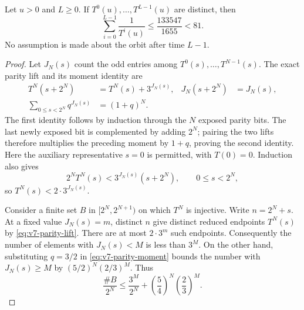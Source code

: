 \begin{theorem}\label{thm:v7-reciprocal}
Let $u>0$ and $L\ge0$. If $T^0(u),\ldots,T^{L-1}(u)$ are distinct, then
\begin{equation}\label{eq:v7-reciprocal}
 \sum_{i=0}^{L-1}\frac1{T^i(u)}
 \le\frac{133547}{1655}<81.
\end{equation}
No assumption is made about the orbit after time $L-1$.
\end{theorem}
\begin{proof}
Let $J_N(s)$ count the odd entries among
$T^0(s),\ldots,T^{N-1}(s)$. The exact parity lift and its moment identity
are
\begin{align}
 T^N(s+2^N)&=T^N(s)+3^{J_N(s)},
 &J_N(s+2^N)&=J_N(s),\label{eq:v7-parity-lift}\\
 \sum_{0\le s<2^N}q^{J_N(s)}&=(1+q)^N.\label{eq:v7-parity-moment}
\end{align}
The first identity follows by induction through the $N$ exposed parity
bits. The last newly exposed bit is complemented by adding $2^N$;
pairing the two lifts therefore multiplies the preceding moment by
$1+q$, proving the second identity. Here the auxiliary representative
$s=0$ is permitted, with $T(0)=0$.
Induction also gives
\[
 2^N T^N(s)<3^{J_N(s)}(s+2^N),
 \qquad 0\le s<2^N,
\]
so $T^N(s)<2\cdot3^{J_N(s)}$.

Consider a finite set $B$ in $[2^N,2^{N+1})$ on which $T^N$ is
injective. Write $n=2^N+s$. At a fixed value $J_N(s)=m$, distinct $n$
give distinct reduced endpoints $T^N(s)$ by
\eqref{eq:v7-parity-lift}. There are at most $2\cdot3^m$ such
endpoints. Consequently the number of elements with $J_N(s)<M$ is
less than $3^M$. On the other hand, substituting $q=3/2$ in
\eqref{eq:v7-parity-moment} bounds the number with $J_N(s)\ge M$ by
$(5/2)^N(2/3)^M$. Thus
\[
 \frac{\#B}{2^N}\le
 \frac{3^M}{2^N}+\left(\frac54\right)^N\left(\frac23\right)^M.
\]


\end{proof}
